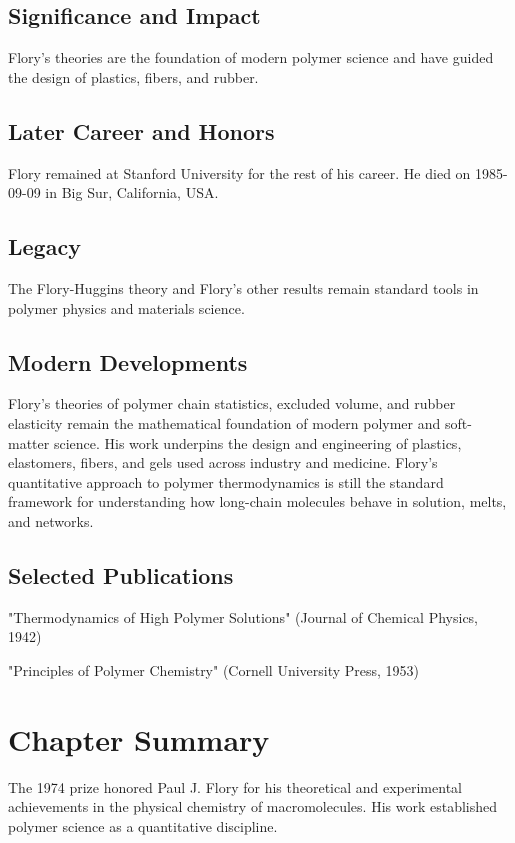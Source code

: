 \subsection*{Significance and Impact}

Flory's theories are the foundation of modern polymer science and have guided the design of plastics, fibers, and rubber.

\subsection*{Later Career and Honors}

Flory remained at Stanford University for the rest of his career. He died on 1985-09-09 in Big Sur, California, USA.

\subsection*{Legacy}

The Flory-Huggins theory and Flory's other results remain standard tools in polymer physics and materials science.

\subsection*{Modern Developments}

Flory's theories of polymer chain statistics, excluded volume, and rubber elasticity remain the mathematical foundation of modern polymer and soft-matter science. His work underpins the design and engineering of plastics, elastomers, fibers, and gels used across industry and medicine. Flory's quantitative approach to polymer thermodynamics is still the standard framework for understanding how long-chain molecules behave in solution, melts, and networks.

\subsection*{Selected Publications}

"Thermodynamics of High Polymer Solutions" (Journal of Chemical Physics, 1942)

"Principles of Polymer Chemistry" (Cornell University Press, 1953)

\clearpage

\section*{Chapter Summary}

The 1974 prize honored Paul J. Flory for his theoretical and experimental achievements in the physical chemistry of macromolecules. His work established polymer science as a quantitative discipline.

